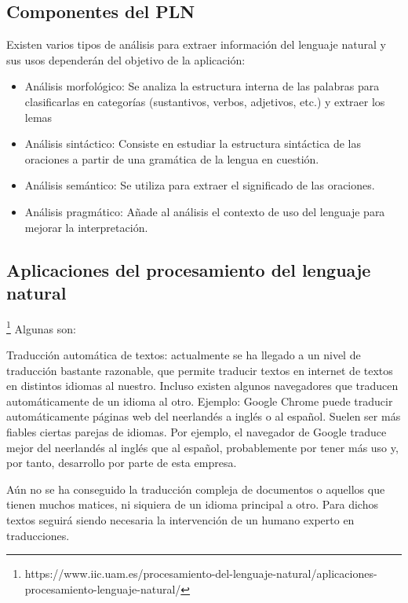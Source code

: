 \subsection{Componentes del PLN}

Existen varios tipos de análisis para extraer información del lenguaje natural y sus usos dependerán del objetivo de la aplicación:

\begin{itemize}
	\item Análisis morfológico: Se analiza la estructura interna de las palabras para clasificarlas en categorías (sustantivos, verbos, adjetivos, etc.) y extraer los lemas 
	
	\item Análisis sintáctico: Consiste en estudiar la estructura sintáctica de las oraciones a partir de una gramática de la lengua en cuestión.
	
	\item Análisis semántico: Se utiliza para extraer el significado de las oraciones.
	
	\item Análisis pragmático: Añade al análisis el contexto de uso del lenguaje para mejorar la interpretación.
\end{itemize}



\subsection{Aplicaciones del procesamiento del lenguaje natural}

\footnote{https://www.iic.uam.es/procesamiento-del-lenguaje-natural/aplicaciones-procesamiento-lenguaje-natural/}
Algunas son:

Traducción automática de textos: actualmente se ha llegado a un nivel de traducción bastante razonable, que permite traducir textos en internet de textos en distintos idiomas al nuestro. Incluso existen algunos navegadores que traducen automáticamente de un idioma al otro. Ejemplo: Google Chrome puede traducir automáticamente páginas web del neerlandés a inglés o al español. Suelen ser más fiables ciertas parejas de idiomas. Por ejemplo, el navegador de Google traduce mejor del neerlandés al inglés que al español, probablemente por tener más uso y, por tanto, desarrollo por parte de esta empresa.

Aún no se ha conseguido la traducción compleja de documentos o aquellos que tienen muchos matices, ni siquiera de un idioma principal a otro. Para dichos textos seguirá siendo necesaria la intervención de un humano experto en traducciones.

